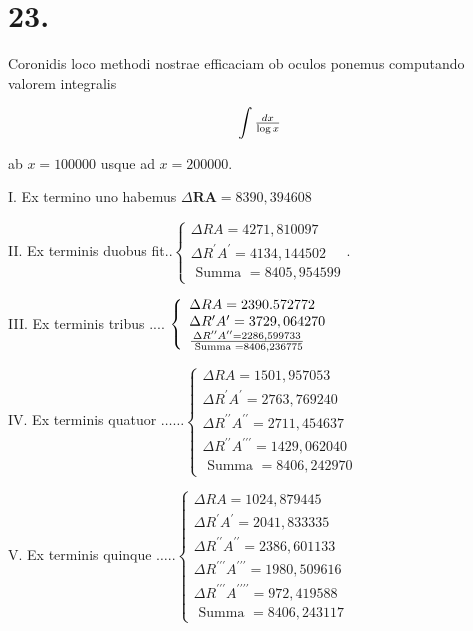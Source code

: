 \documentclass[twoside,12pt, showframe]{memoir}
\let\oldfrac\frac
\def\frac#1#2{\mathchoice{\tfrac{#1}{#2}}{\oldfrac{#1}{#2}}{\genfrac{}{}{}{2}{#1}{#2\mathstrut}}{\genfrac{}{}{}{3}{#1}{#2\mathstrut}}}
\begin{document}
\section*{23.}
Coronidis loco methodi nostrae efficaciam ob oculos ponemus computando valorem integralis

\[
\int \frac{d x}{\log x}
\]

ab \(x=100000\) usque ad \(x=200000\).

I. Ex termino uno habemus \(\Delta \boldsymbol{R} \boldsymbol{A}=8390,394608\)

II. Ex terminis duobus fit..\(\left\{\begin{array}{l}\Delta R A=4271,810097 \\ \Delta R^{\prime} A^{\prime}=4134,144502 \\ \hline \text { Summa }=8405,954599\end{array}\right.\).

III. Ex terminis tribus .... \(\left\{\begin{array}{l}\Delta R A=2390.572772 \\ \Delta R^{\prime} A^{\prime}=3729,064270 \\ \frac{\Delta R^{\prime \prime} A^{\prime \prime}=2286,599733}{\text { Summa }=8406,236775}\end{array}\right.\)

IV. Ex terminis quatuor \(\ldots \ldots\left\{\begin{array}{l}\Delta R A=1501,957053 \\ \Delta R^{\prime} A^{\prime}=2763,769240 \\ \Delta R^{\prime \prime} A^{\prime \prime}=2711,454637 \\ \Delta R^{\prime \prime} A^{\prime \prime \prime}=1429,062040 \\ \text { Summa }=8406,242970\end{array}\right.\)

V. Ex terminis quinque \(\ldots . .\left\{\begin{array}{l}\Delta R A=1024,879445 \\ \Delta R^{\prime} A^{\prime}=2041,833335 \\ \Delta R^{\prime \prime} A^{\prime \prime}=2386,601133 \\ \Delta R^{\prime \prime \prime} A^{\prime \prime \prime}=1980,509616 \\ \Delta R^{\prime \prime \prime} A^{\prime \prime \prime \prime}=972,419588 \\ \hline \text { Summa }=8406,243117\end{array}\right.\)
\end{document}
